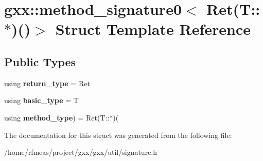 \hypertarget{structgxx_1_1method__signature0_3_01Ret_07T_1_1_5_08_07_08_4}{}\section{gxx\+:\+:method\+\_\+signature0$<$ Ret(T\+:\+:$\ast$)()$>$ Struct Template Reference}
\label{structgxx_1_1method__signature0_3_01Ret_07T_1_1_5_08_07_08_4}
\subsection*{Public Types}
\begin{DoxyCompactItemize}
\item 
using {\bfseries return\+\_\+type} = Ret\hypertarget{structgxx_1_1method__signature0_3_01Ret_07T_1_1_5_08_07_08_4_ad6ce86c67bc27d726283bd1c42249961}{}\label{structgxx_1_1method__signature0_3_01Ret_07T_1_1_5_08_07_08_4_ad6ce86c67bc27d726283bd1c42249961}

\item 
using {\bfseries basic\+\_\+type} = T\hypertarget{structgxx_1_1method__signature0_3_01Ret_07T_1_1_5_08_07_08_4_aea184be172665001ccebedb1d560417a}{}\label{structgxx_1_1method__signature0_3_01Ret_07T_1_1_5_08_07_08_4_aea184be172665001ccebedb1d560417a}

\item 
using {\bfseries method\+\_\+type}) = Ret(T\+::$\ast$)(\hypertarget{structgxx_1_1method__signature0_3_01Ret_07T_1_1_5_08_07_08_4_a3ec904be236b75ebcbaf5a1c4c03ae0c}{}\label{structgxx_1_1method__signature0_3_01Ret_07T_1_1_5_08_07_08_4_a3ec904be236b75ebcbaf5a1c4c03ae0c}

\end{DoxyCompactItemize}


The documentation for this struct was generated from the following file\+:\begin{DoxyCompactItemize}
\item 
/home/rfmeas/project/gxx/gxx/util/signature.\+h\end{DoxyCompactItemize}
